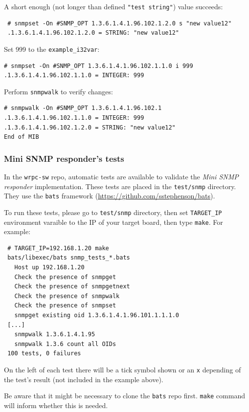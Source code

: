 \documentclass[a4paper, 12pt]{article}
\begin{document}
A short enough (not longer than defined \texttt{"test string"}) value succeeds:
\begin{lstlisting}
 # snmpset -On #SNMP_OPT 1.3.6.1.4.1.96.102.1.2.0 s "new value12"
 .1.3.6.1.4.1.96.102.1.2.0 = STRING: "new value12"
\end{lstlisting}

Set 999 to the \texttt{example\_i32var}:
\begin{lstlisting}
# snmpset -On #SNMP_OPT 1.3.6.1.4.1.96.102.1.1.0 i 999
.1.3.6.1.4.1.96.102.1.1.0 = INTEGER: 999
\end{lstlisting}

Perform \texttt{snmpwalk} to verify changes:
\begin{lstlisting}
# snmpwalk -On #SNMP_OPT 1.3.6.1.4.1.96.102.1
.1.3.6.1.4.1.96.102.1.1.0 = INTEGER: 999
.1.3.6.1.4.1.96.102.1.2.0 = STRING: "new value12"
End of MIB
\end{lstlisting}

\label{Mini SNMP responder's tests}
\subsubsection{Mini SNMP responder's tests}

In the \texttt{wrpc-sw} repo, automatic tests are available to validate the \textit{Mini
SNMP responder} implementation. These tests are placed in the \texttt{test/snmp}
directory.
They use the \texttt{bats} framework (\url{https://github.com/sstephenson/bats}).

To run these tests, please go to \texttt{test/snmp} directory, then set
\texttt{TARGET\_IP} environment varaible to the IP of your target board, then type
\texttt{make}. For example:
\begin{lstlisting}
 # TARGET_IP=192.168.1.20 make
 bats/libexec/bats snmp_tests_*.bats
   Host up 192.168.1.20
   Check the presence of snmpget
   Check the presence of snmpgetnext
   Check the presence of snmpwalk
   Check the presence of snmpset
   snmpget existing oid 1.3.6.1.4.1.96.101.1.1.1.0
 [...]
   snmpwalk 1.3.6.1.4.1.95
   snmpwalk 1.3.6 count all OIDs
 100 tests, 0 failures
\end{lstlisting}
On the left of each test there will be a tick symbol shown or an \texttt{x}
depending of the test's result (not included in the example above).

Be aware that it might be necessary to clone the \texttt{bats} repo first.
\texttt{make} command will inform whether this is needed.
\end{document}
